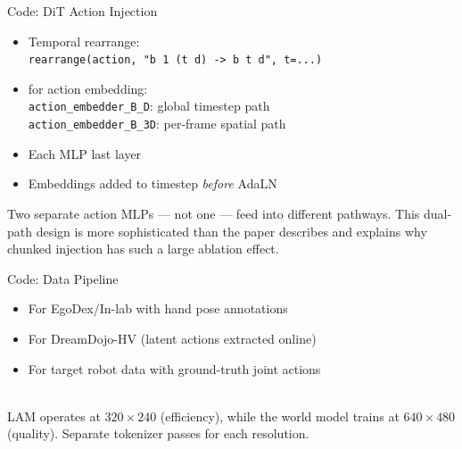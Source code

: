 \begin{frame}{Code: DiT Action Injection}
\begin{methodbox}
\begin{itemize}
    \item Temporal rearrange:\\
          {\small \texttt{rearrange(action, "b 1 (t d) -> b t d", t=...)}}
    \item {} for action embedding:\\
          {\small \texttt{action\_embedder\_B\_D}: global timestep path\\
          \texttt{action\_embedder\_B\_3D}: per-frame spatial path}
    \item Each MLP last layer 
    \item Embeddings added to timestep \emph{before} AdaLN
\end{itemize}
\end{methodbox}

\vspace{0.3em}
\begin{softbox}
 Two separate action MLPs ---
not one --- feed into different pathways.
This dual-path design is more sophisticated
than the paper describes and explains why
chunked injection has such a large ablation effect.
\end{softbox}
\end{frame}

\begin{frame}{Code: Data Pipeline}
\begin{methodbox}
\begin{itemize}
    \item {} For EgoDex/In-lab
          with hand pose annotations
    \item {} For DreamDojo-HV
          (latent actions extracted online)
    \item {} For target robot data
          with ground-truth joint actions
\end{itemize}
\end{methodbox}

\vspace{0.3em}
\\
{\small LAM operates at $320\times240$ (efficiency),
while the world model trains at $640\times480$ (quality).
Separate tokenizer passes for each resolution.}
\end{frame}

